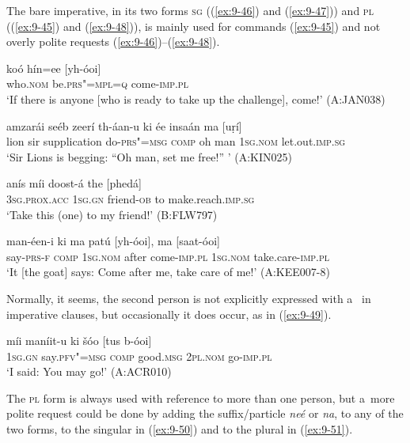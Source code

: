 The bare imperative, in its two forms \textsc{sg} ((\ref{ex:9-46}) and (\ref{ex:9-47})) and \textsc{pl (}(\ref{ex:9-45}) and (\ref{ex:9-48})\textsc{)}, is mainly used for commands (\ref{ex:9-45}) and not overly polite requests (\ref{ex:9-46})--(\ref{ex:9-48}).

\begin{exe}
\ex
\label{ex:9-45}
\gll koó hín=ee [yh-óoi]  \\
who.\textsc{nom} be.\textsc{prs"=mpl=q} come-\textsc{imp.pl}  \\
\glt `If there is anyone [who is ready to take up the challenge], come!' (A:JAN038)

\ex
\label{ex:9-46}
\gll amzarái seéb zeerí th-áan-u ki ée insaán ma [uṛí] \\
lion sir supplication do-\textsc{prs"=msg} \textsc{comp} oh  man \textsc{1sg.nom} let.out.\textsc{imp.sg} \\
\glt `Sir Lions is begging: ``Oh man, set me free!'' ' (A:KIN025)

\ex
\label{ex:9-47}
\gll anís míi doost-á the [phedá] \\
\textsc{3sg.prox.acc} \textsc{1sg.gn} friend-\textsc{ob} to make.reach.\textsc{imp.sg} \\
\glt `Take this (one) to my friend!' (B:FLW797)

\ex
\label{ex:9-48}
\gll man-éen-i ki ma patú [yh-óoi], ma [saat-óoi] \\
say-\textsc{prs-f} \textsc{comp} \textsc{1sg.nom} after come-\textsc{imp.pl} \textsc{1sg.nom} take.care-\textsc{imp.pl} \\
\glt `It [the goat] says: Come after me, take care of me!' (A:KEE007-8)
\end{exe}

Normally, it seems, the second person is not explicitly expressed with a~ in imperative clauses, but occasionally it does occur, as in (\ref{ex:9-49}).

\begin{exe}
\ex
\label{ex:9-49}
\gll míi maníit-u ki šóo [tus b-óoi] \\
\textsc{1sg.gn} say.\textsc{pfv"=msg} \textsc{comp} good.\textsc{msg} \textsc{2pl.nom} go-\textsc{imp.pl} \\
\glt `I said: You may go!' (A:ACR010)
\end{exe}

The \textsc{pl} form is always used with reference to more than one person, but a~more polite request could be done by adding the suffix/particle \textit{neé} or \textit{na}, to any of the two forms, to the singular in (\ref{ex:9-50}) and to the plural in (\ref{ex:9-51}).

